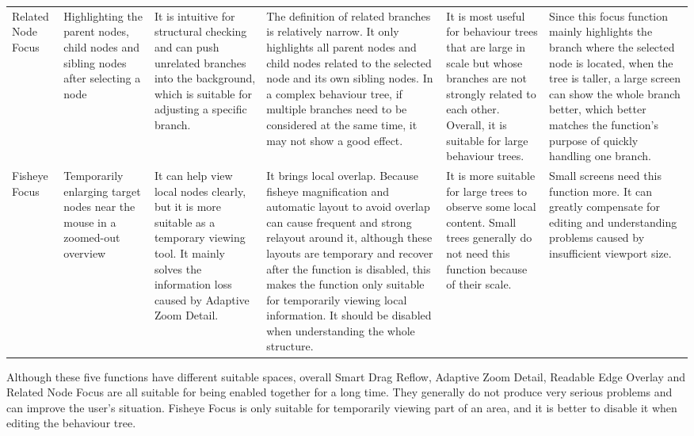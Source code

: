 \begin{center}
\begin{longtable}{@{}p{} p{} p{} p{} p{} p{}@{}}
Related Node Focus & Highlighting the parent nodes, child nodes and sibling nodes after selecting a node & It is intuitive for structural checking and can push unrelated branches into the background, which is suitable for adjusting a specific branch. & The definition of related branches is relatively narrow. It only highlights all parent nodes and child nodes related to the selected node and its own sibling nodes. In a complex behaviour tree, if multiple branches need to be considered at the same time, it may not show a good effect. & It is most useful for behaviour trees that are large in scale but whose branches are not strongly related to each other. Overall, it is suitable for large behaviour trees. & Since this focus function mainly highlights the branch where the selected node is located, when the tree is taller, a large screen can show the whole branch better, which better matches the function's purpose of quickly handling one branch. \\
Fisheye Focus & Temporarily enlarging target nodes near the mouse in a zoomed-out overview & It can help view local nodes clearly, but it is more suitable as a temporary viewing tool. It mainly solves the information loss caused by Adaptive Zoom Detail. & It brings local overlap. Because fisheye magnification and automatic layout to avoid overlap can cause frequent and strong relayout around it, although these layouts are temporary and recover after the function is disabled, this makes the function only suitable for temporarily viewing local information. It should be disabled when understanding the whole structure. & It is more suitable for large trees to observe some local content. Small trees generally do not need this function because of their scale. & Small screens need this function more. It can greatly compensate for editing and understanding problems caused by insufficient viewport size. \\
\bottomrule
\end{longtable}
\end{center}

Although these five functions have different suitable spaces, overall Smart Drag Reflow, Adaptive Zoom Detail, Readable Edge Overlay and Related Node Focus are all suitable for being enabled together for a long time. They generally do not produce very serious problems and can improve the user's situation. Fisheye Focus is only suitable for temporarily viewing part of an area, and it is better to disable it when editing the behaviour tree.
